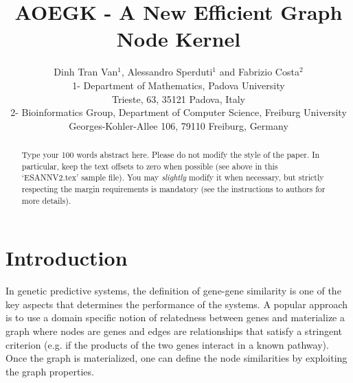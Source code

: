 \documentclass{esannV2}
\begin{document}
\title{AOEGK - A New Efficient Graph Node Kernel}

\author{Dinh Tran Van$^1$, Alessandro Sperduti$^1$ and Fabrizio Costa$^2$
%
%
\vspace{.3cm}\\
%
1- Department of Mathematics, Padova University\\
Trieste, 63, 35121 Padova, Italy
%
\vspace{.1cm}\\
2- Bioinformatics Group, Department of Computer Science, Freiburg University \\
Georges-Kohler-Allee 106, 79110 Freiburg, Germany\\
}

\maketitle

\begin{abstract}
Type your 100 words abstract here. Please do not modify the style
of the paper. In particular, keep the text offsets to zero when
possible (see above in this `ESANNV2.tex' sample file). You may
\emph{slightly} modify it when necessary, but strictly respecting
the margin requirements is mandatory (see the instructions to
authors for more details).
\end{abstract}

\section{Introduction} \label{introduction}
In genetic predictive systems, the definition of gene-gene similarity is one of the key aspects that determines the performance of the systems. 
A popular approach is to use a domain specific notion of relatedness between genes and materialize a graph where nodes are genes and edges are relationships that satisfy a stringent criterion (e.g. if the products of the two genes interact in a known pathway). 
Once the graph is materialized, one can define the node similarities by exploiting the graph properties.
\end{document}
